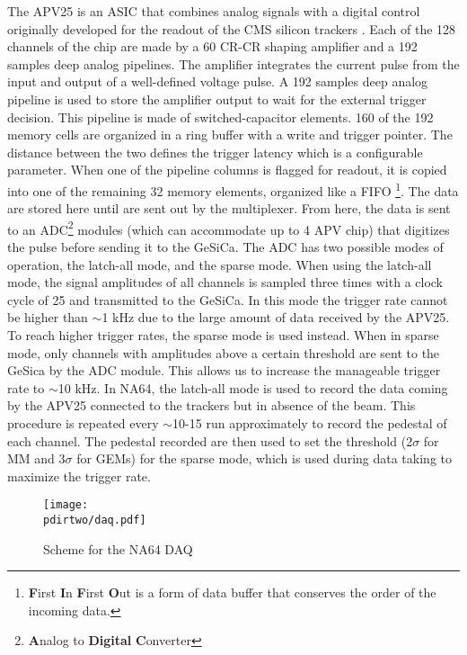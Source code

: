 The APV25 is an ASIC that combines analog signals with a digital control \cite{Bodlak_2013} originally developed for the readout of the CMS silicon trackers \cite{article,inproceedings,apv-useguide}. Each of the 128 channels of the chip are made by a 60 \nas CR-CR shaping amplifier and a 192 samples deep analog pipelines. The amplifier integrates the current pulse from the input and output of a well-defined voltage pulse. A 192 samples deep analog pipeline is used to store the amplifier output to wait for the external trigger decision. This pipeline is made of switched-capacitor elements. 160 of the 192 memory cells are organized in a ring buffer with a write and trigger pointer. The distance between the two defines the trigger latency which is a configurable parameter. When one of the pipeline columns is flagged for readout, it is copied into one of the remaining 32 memory elements, organized like a FIFO \footnote{\textbf{F}irst \textbf{I}n \textbf{F}irst \textbf{O}ut is a form of data buffer that conserves the order of the incoming data.}. The data are stored here until are sent out by the multiplexer. From here, the data is sent to an ADC\footnote{\textbf{A}nalog to \textbf{Digital} \textbf{C}onverter} modules (which can accommodate up to 4 APV chip) that digitizes the pulse before sending it to the GeSiCa. The ADC has two possible modes of operation, the latch-all mode, and the sparse mode. When using the latch-all mode, the signal amplitudes of all channels is sampled three times with a clock cycle of 25 \nas and transmitted to the GeSiCa. In this mode the trigger rate cannot be higher than $\sim$1 \si{\kilo\hertz} due to the large amount of data received by the APV25. To reach higher trigger rates, the sparse mode is used instead. When in sparse mode, only channels with amplitudes above a certain threshold are sent to the GeSica by the ADC module. This allows us to increase the manageable trigger rate to $\sim$10 \si{\kilo\hertz}. In NA64, the latch-all mode is used to record the data coming by the APV25 connected to the trackers but in absence of the beam. This procedure is repeated every $\sim$10-15 run approximately to record the pedestal of each channel. The pedestal recorded are then used to set the threshold (2$\sigma$ for MM and 3$\sigma$ for GEMs) for the sparse mode, which is used during data taking to maximize the trigger rate.

\begin{figure}[tbh!]
\centering
\texttt{[image: \\pdirtwo/daq.pdf]}
\caption{Scheme for the NA64 DAQ}
\label{fig:daq}
\end{figure}

